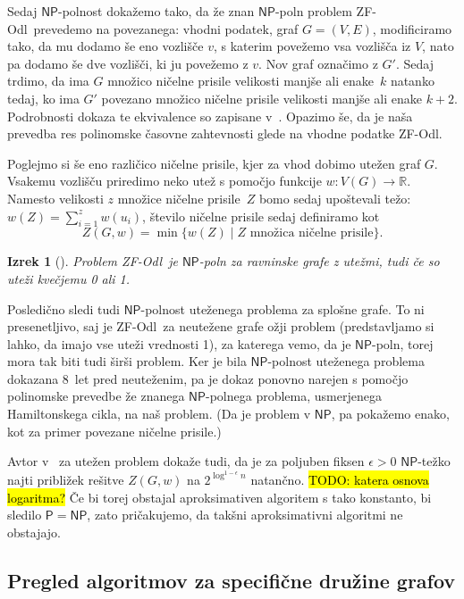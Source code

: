 \documentclass[12pt,a4paper,twoside]{article}
\theoremstyle{definition} %
\theoremstyle{plain} %
\newtheorem{izrek}[definicija]{Izrek}
\numberwithin{equation}{section}  %
\newcommand{\R}{\mathbb R}
\renewcommand{\P}{\ensuremath{\mathsf{P}}}
\newcommand{\NP}{\ensuremath{\mathsf{NP}}}
\newcommand{\ZFOdl}{\textsf{ZF-Odl}}
\begin{document}
Sedaj $\NP$-polnost dokažemo tako, da že znan $\NP$-poln problem \ZFOdl\ prevedemo na povezanega: vhodni podatek, graf $G = (V,E)$, modificiramo tako, da mu dodamo še eno vozlišče $v$, s katerim povežemo vsa vozlišča iz $V$, nato pa dodamo še dve vozlišči, ki ju povežemo z $v$. Nov graf označimo z $G'$. Sedaj trdimo, da ima $G$ množico ničelne prisile velikosti manjše ali enake~$k$ natanko tedaj, ko ima $G'$ povezano množico ničelne prisile velikosti manjše ali enake $k + 2$. Podrobnosti dokaza te ekvivalence so zapisane v~\cite{brimkov2017complexity}. Opazimo še, da je naša prevedba res polinomske časovne zahtevnosti glede na vhodne podatke \ZFOdl.

Poglejmo si še eno različico ničelne prisile, kjer za vhod dobimo utežen graf $G$.
Vsakemu vozlišču priredimo neko utež s pomočjo funkcije $w\colon V(G) \rightarrow \R$. Namesto velikosti $z$ množice ničelne prisile~$Z$ bomo sedaj upoštevali težo: $w(Z) = \sum_{i=1}^{z} w(u_i)$, število ničelne prisile sedaj definiramo kot
\[ Z(G, w) = \min\{ w(Z) \mid Z \text{ množica ničelne prisile} \} .\]

\begin{izrek}[\cite{aazami2008hardness}]
    Problem \ZFOdl\ je $\NP$-poln za ravninske grafe z utežmi, tudi če so uteži kvečjemu 0 ali 1.
\end{izrek}
Posledično sledi tudi $\NP$-polnost uteženega problema za splošne grafe. To ni presenetljivo, saj je \ZFOdl\ za neutežene grafe ožji problem (predstavljamo si lahko, da imajo vse uteži vrednosti 1), za katerega vemo, da je $\NP$-poln, torej mora tak biti tudi širši problem. Ker je bila $\NP$-polnost uteženega problema dokazana 8~let pred neuteženim, pa je dokaz ponovno narejen s pomočjo polinomske prevedbe že znanega $\NP$-polnega problema, usmerjenega Hamiltonskega cikla, na naš problem. (Da je problem v $\NP$, pa pokažemo enako, kot za primer povezane ničelne prisile.)

Avtor v~\cite[izrek~2.3.8]{aazami2008hardness} za utežen problem dokaže tudi, da je za poljuben fiksen $\epsilon > 0$ $\NP$-težko najti približek rešitve $Z(G,w)$ na $2^{\log^{1-\epsilon}n}$ natančno. \hl{TODO: katera osnova logaritma?} Če bi torej obstajal aproksimativen algoritem s tako konstanto, bi sledilo $\P = \NP$, zato pričakujemo, da takšni aproksimativni algoritmi ne obstajajo.

\subsection{Pregled algoritmov za specifične družine grafov}
\end{document}
